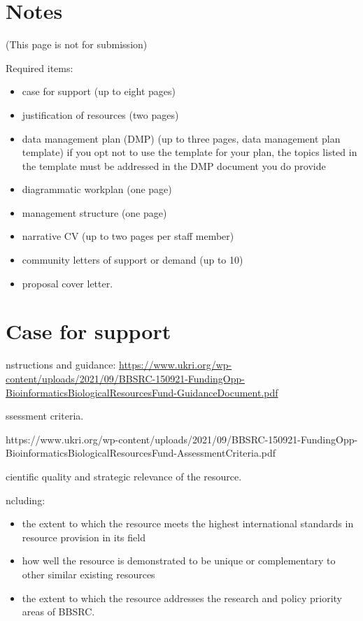 \documentclass[a4paper,11point]{article}
\title{}
\author{}
\def\ii#1\par{{\color{blue!40}\sl #1}\par}
\def\iibf#1\par{{\color{blue!40}\sl\bfseries #1}\par}
\begin{document}
\section{Notes}

(This page is not for submission)

Required items:
\begin{itemize}  
  \item case for support (up to eight pages)
  \item justification of resources (two pages)
  \item data management plan (DMP) (up to three pages, data management plan template)
        if you opt not to use the template for your plan, the topics listed in the template must be addressed in the DMP document you do provide
  \item diagrammatic workplan (one page)
  \item management structure (one page)
  \item narrative CV (up to two pages per staff member)
  \item community letters of support or demand (up to 10)  
  \item proposal cover letter.
\end{itemize}

    
\newpage



\section{Case for support}

\ii Instructions and guidance:
  \url{https://www.ukri.org/wp-content/uploads/2021/09/BBSRC-150921-FundingOpp-BioinformaticsBiologicalResourcesFund-GuidanceDocument.pdf}

\iibf Assessment criteria.

\ii \url{https://www.ukri.org/wp-content/uploads/2021/09/BBSRC-150921-FundingOpp-BioinformaticsBiologicalResourcesFund-AssessmentCriteria.pdf}

\iibf Scientific quality and strategic relevance of the resource.

\ii Including:
\begin{itemize}[nosep]
    \item the extent to which the resource meets the highest international standards in resource provision in its field
    \item how well the resource is demonstrated to be unique or complementary to other similar existing resources
    \item the extent to which the resource addresses the research and policy priority areas of BBSRC.
\end{itemize}
\end{document}

